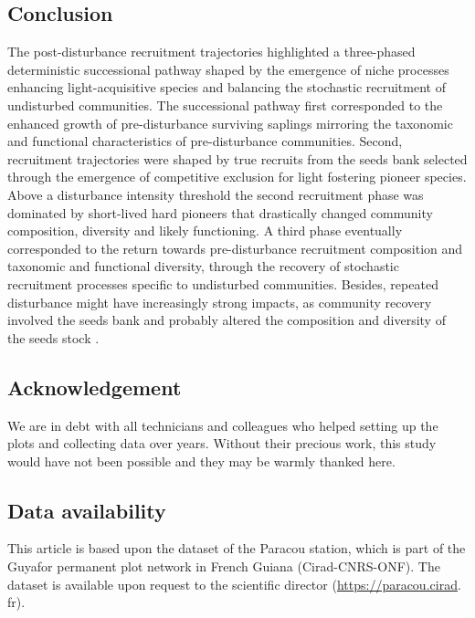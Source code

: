 \documentclass[
  11pt,
  french,
  A4paper,
  extrafontsizes,onecolumn,openright
  ]{memoir}
\begin{document}
\subsection{Conclusion}\label{conclusion-1}

The post-disturbance recruitment trajectories highlighted a three-phased
deterministic successional pathway shaped by the emergence of niche
processes enhancing light-acquisitive species and balancing the
stochastic recruitment of undisturbed communities. The successional
pathway first corresponded to the enhanced growth of pre-disturbance
surviving saplings mirroring the taxonomic and functional
characteristics of pre-disturbance communities. Second, recruitment
trajectories were shaped by true recruits from the seeds bank selected
through the emergence of competitive exclusion for light fostering
pioneer species. Above a disturbance intensity threshold the second
recruitment phase was dominated by short-lived hard pioneers that
drastically changed community composition, diversity and likely
functioning. A third phase eventually corresponded to the return towards
pre-disturbance recruitment composition and taxonomic and functional
diversity, through the recovery of stochastic recruitment processes
specific to undisturbed communities. Besides, repeated disturbance might
have increasingly strong impacts, as community recovery involved the
seeds bank and probably altered the composition and diversity of the
seeds stock \autocite{Norden2009}.

\subsection{Acknowledgement}\label{acknowledgement-1}

We are in debt with all technicians and colleagues who helped setting up
the plots and collecting data over years. Without their precious work,
this study would have not been possible and they may be warmly thanked
here.

\subsection{Data availability}\label{data-availability-1}

This article is based upon the dataset of the Paracou station, which is
part of the Guyafor permanent plot network in French Guiana
(Cirad-CNRS-ONF). The dataset is available upon request to the
scientific director (\url{https://paracou.cirad}. fr).
\end{document}

